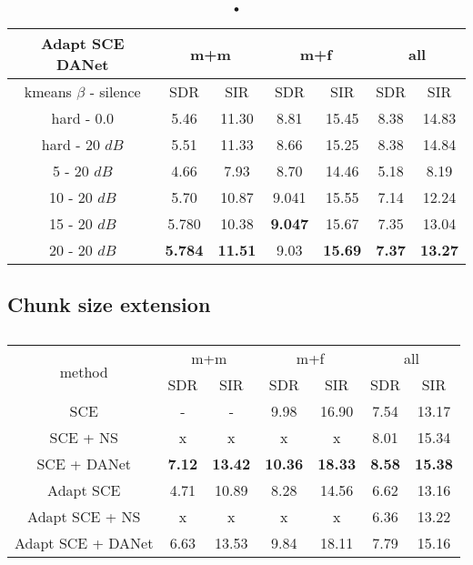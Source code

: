 \documentclass[master,final,11pt]{iscs-thesis}
\begin{document}
\begin{table}[h]
\centering
\begin{tabular}{c|c|c|c|c|c|c}
Adapt SCE DANet & \multicolumn{2}{c|}{m+m} & \multicolumn{2}{c|}{m+f} & \multicolumn{2}{c}{all} \\ 
\hline 
kmeans $\beta$ - silence & SDR & SIR & SDR & SIR & SDR & SIR \\ 
\hline
hard - 0.0  & 5.46 & 11.30 & 8.81 & 15.45 & 8.38 & 14.83 \\ 
hard - 20 $dB$  & 5.51 & 11.33 & 8.66 & 15.25 & 8.38 & 14.84 \\
\hline
\hline
5 - 20 $dB$  & 4.66 & 7.93 & 8.70 & 14.46 & 5.18 & 8.19 \\ 
10 - 20 $dB$  & 5.70 & 10.87 & 9.041 & 15.55 & 7.14 & 12.24 \\ 
15 - 20 $dB$ & 5.780 & 10.38 & \textbf{9.047} & 15.67 & 7.35 & 13.04 \\ 
20 - 20 $dB$ & \textbf{5.784} & \textbf{11.51} & 9.03 & \textbf{15.69} & \textbf{7.37} & \textbf{13.27} \\ 
\end{tabular}
\caption{•}
\label{table:AdaptSCEDANET}
\end{table}

\subsection{Chunk size extension}
\label{ext}

\begin{table}[h]
\centering
\begin{tabular}{c|c|c|c|c|c|c}
\multirow{2}{*}{method} & \multicolumn{2}{c|}{m+m} & \multicolumn{2}{c|}{m+f} & \multicolumn{2}{c}{all} \\ 
\cline{2-7} 
 & SDR & SIR & SDR & SIR & SDR & SIR \\ 
\hline
SCE  & - & - & 9.98 & 16.90 & 7.54 & 13.17 \\
SCE + NS  & x & x & x & x & 8.01 & 15.34 \\
SCE + DANet  & \textbf{7.12} & \textbf{13.42} & \textbf{10.36} & \textbf{18.33} & \textbf{8.58} & \textbf{15.38} \\ 
\hline
\hline
Adapt SCE  & 4.71 & 10.89 & 8.28 & 14.56 & 6.62 & 13.16 \\
Adapt SCE + NS  & x & x & x & x & 6.36 & 13.22 \\
Adapt SCE + DANet  & 6.63 & 13.53 & 9.84 & 18.11 & 7.79 & 15.16 \\ 

\end{tabular}
\captionsetup{justification=centering}
\caption{}
\label{table:SCE400recap}
\end{table}
\end{document}
